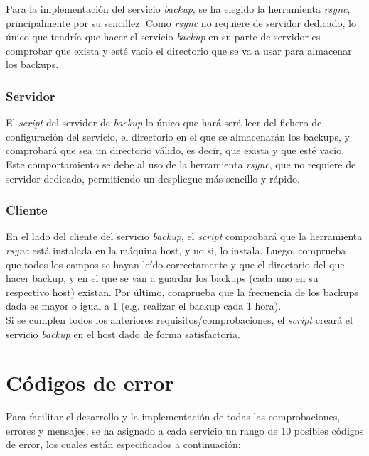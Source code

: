 \documentclass[12pt,a4paper, spanish]{article}
\begin{document}
\noindent Para la implementación del servicio \textit{backup}, se ha elegido la herramienta \textit{rsync}, principalmente por su sencillez. Como \textit{rsync} no requiere de servidor dedicado, lo único que tendría que hacer el servicio \textit{backup} en su parte de servidor es comprobar que exista y esté vacío el directorio que se va a usar para almacenar los backups.\\

\subsubsection{Servidor}

\noindent El \textit{script} del servidor de \textit{backup} lo único que hará será leer del fichero de configuración del servicio, el directorio en el que se almacenarán los backups, y comprobará que sea un directorio válido, es decir, que exista y que esté vacío.\\

Este comportamiento se debe al uso de la herramienta \textit{rsync}, que no requiere de servidor dedicado, permitiendo un despliegue más sencillo y rápido.

\subsubsection{Cliente}

\noindent En el lado del cliente del servicio \textit{backup}, el \textit{script} comprobará que la herramienta \textit{rsync} está instalada en la máquina host, y no si, lo instala. Luego, comprueba que todos los campos se hayan leído correctamente y que el directorio del que hacer backup, y en el que se van a guardar los backups (cada uno en su respectivo host) existan. Por último, comprueba que la frecuencia de los backups dada es mayor o igual a 1 (e.g. realizar el backup cada 1 hora).\\

Si se cumplen todos los anteriores requisitos/comprobaciones, el \textit{script} creará el servicio \textit{backup} en el host dado de forma satisfactoria.


\newpage
\section{Códigos de error}
\noindent Para facilitar el desarrollo y la implementación de todas las comprobaciones, errores y mensajes, se ha asignado a cada servicio un rango de 10 posibles códigos de error, los cuales están especificados a continuación:
\end{document}
